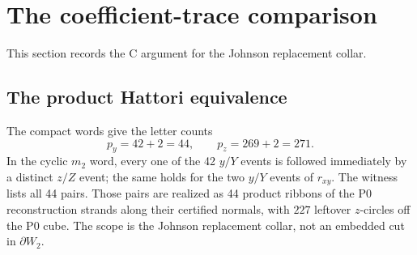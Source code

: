 \section{The coefficient-trace comparison}\label{sec:c-comparison}

This section records the C argument for the Johnson replacement collar.

\subsection{The product Hattori equivalence}

The compact words give the letter counts
\[
p_y=42+2=44,\qquad p_z=269+2=271.
\]
In the cyclic $m_2$ word, every one of the 42
$y/Y$ events is followed immediately by a distinct $z/Z$ event; the same
holds for the two $y/Y$ events of $r_{xy}$.  The witness lists all 44 pairs.
Those pairs are realized as 44 product ribbons of the P0 reconstruction
strands along their certified normals, with $227$ leftover $z$-circles off
the P0 cube.  The scope is the Johnson replacement collar, not an embedded
cut in $\partial W_2$.

